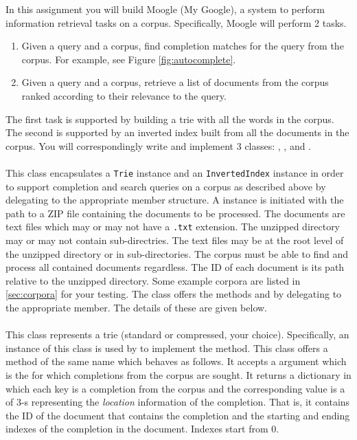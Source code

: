 \documentclass[addpoints]{exam}
\begin{document}
In this assignment you will build Moogle (My Google), a system to perform information retrieval tasks on a corpus. Specifically, Moogle will perform 2 tasks.
\begin{enumerate}
\item Given a query and a corpus, find completion matches for the query from the corpus. For example, see Figure \ref{fig:autocomplete}.
\item Given a query and a corpus, retrieve a list of documents from the corpus ranked according to their relevance to the query.
\end{enumerate}

The first task is supported by building a trie with all the words in the corpus. The second is supported by an inverted index built from all the documents in the corpus. You will correspondingly write and implement 3 classes: , , and .

\paragraph{} This class encapsulates a \texttt{Trie} instance and an \texttt{InvertedIndex} instance in order to support completion and search queries on a corpus as described above by delegating to the appropriate member structure. A  instance is initiated with the path to a ZIP file containing the documents to be processed. The documents are text files which may or may not have a \texttt{.txt} extension. The unzipped directory may or may not contain sub-directries. The text files may be at the root level of the unzipped directory or in sub-directories. The corpus must be able to find and process all contained documents regardless. The ID of each document is its path relative to the unzipped directory. Some example corpora are listed in \cref{sec:corpora} for your testing. The class offers the methods  and  by delegating to the appropriate member. The details of these are given below.

\paragraph{} This class represents a trie (standard or compressed, your choice). Specifically, an instance of this class is used by  to implement the  method. This class offers a method of the same name which behaves as follows. It accepts a  argument which is the  for which completions from the corpus are sought. It returns a dictionary in which each key is a completion from the corpus and the corresponding value is a  of 3-s representing the \textit{location} information of the completion. That is, it contains the ID of the document that contains the completion and the starting and ending indexes of the completion in the document. Indexes start from 0.
\end{document}
